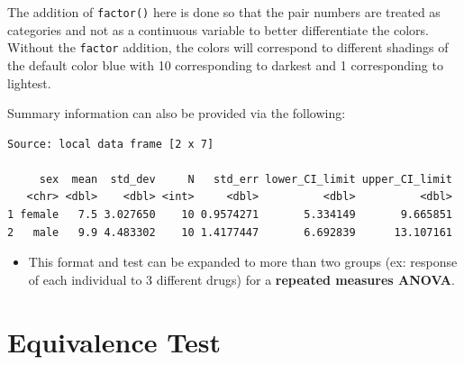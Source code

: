 \documentclass[twoside, 12pt]{article}
\newenvironment{Shaded}{\begin{snugshade}}{\end{snugshade}}
\newcommand{\KeywordTok}[1]{\textcolor[rgb]{0.13,0.29,0.53}{\textbf{{#1}}}}
\newcommand{\DataTypeTok}[1]{\textcolor[rgb]{0.13,0.29,0.53}{{#1}}}
\newcommand{\DecValTok}[1]{\textcolor[rgb]{0.00,0.00,0.81}{{#1}}}
\newcommand{\FloatTok}[1]{\textcolor[rgb]{0.00,0.00,0.81}{{#1}}}
\newcommand{\StringTok}[1]{\textcolor[rgb]{0.31,0.60,0.02}{{#1}}}
\newcommand{\NormalTok}[1]{{#1}}
\providecommand{\tightlist}{%
  \setlength{\itemsep}{0pt}\setlength{\parskip}{0pt}}
\begin{document}
The addition of \texttt{factor()} here is done so that the pair numbers
are treated as categories and not as a continuous variable to better
differentiate the colors. Without the \texttt{factor} addition, the
colors will correspond to different shadings of the default color blue
with 10 corresponding to darkest and 1 corresponding to lightest.

Summary information can also be provided via the following:

\begin{Shaded}
\end{Shaded}

\begin{Verbatim}[frame=single]
Source: local data frame [2 x 7]

     sex  mean  std_dev     N   std_err lower_CI_limit upper_CI_limit
   <chr> <dbl>    <dbl> <int>     <dbl>          <dbl>          <dbl>
1 female   7.5 3.027650    10 0.9574271       5.334149       9.665851
2   male   9.9 4.483302    10 1.4177447       6.692839      13.107161
\end{Verbatim}

\begin{itemize}
\tightlist
\item
  This format and test can be expanded to more than two groups (ex:
  response of each individual to 3 different drugs) for a
  \textbf{repeated measures ANOVA}.
\end{itemize}

\section{Equivalence Test}\label{equivalence-test}
\end{document}
